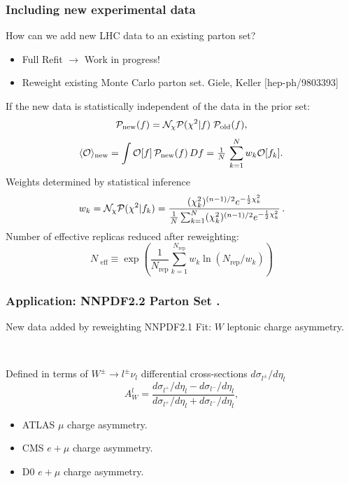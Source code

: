 \documentclass[10pt]{beamer}
\newcommand{\be}{\begin{equation*}}
\newcommand{\ee}{\end{equation*}}
\def\smallfrac#1#2{\hbox{${{#1}\over {#2}}$}}
\begin{document}
\begin{frame}
\frametitle{Including new experimental data}
How can we add new LHC data to an existing parton set?

\begin{itemize}
		\item<1-> Full Refit $\to$ Work in progress!
		\item<1-> Reweight existing Monte Carlo parton set. {\small \color{blue} Giele, Keller [hep-ph/9803393] }\\
\end{itemize}
If the new data is statistically independent of the data in the prior set:
\be
\mathcal{P}_{\rm new}(f)
= \mathcal{N}_{\chi}\mathcal{P}(\chi^2|f)\;\mathcal{P}_{\rm old}(f),
\ee
		\be \langle\mathcal{O}\rangle_{\mathrm {new}}=\int \mathcal{O}[f] \, \mathcal{P}_{ \mathrm {new}}(f)\,Df=\smallfrac{1}{N}\,\sum_{k=1}^{N}w_k\mathcal{O}[f_k].\,  \ee
Weights determined by statistical inference
\be w_k =\mathcal{N}_\chi\mathcal{P}(\chi^2|f_k) = 
\frac{(\chi^{2}_k)^{(n-1)/2} 
e^{-\frac{1}{2}\chi^{2}_k}}
{\smallfrac{1}{N}\sum_{k=1}^{N}(\chi^{2}_k)^{(n-1)/2}
e^{-\frac{1}{2}\chi^{2}_k}}\, .\ee
 Number of effective replicas reduced after reweighting: \be N_{\textrm{ eff}} \equiv \exp \left(\frac{1}{N_{\mathrm{rep}}}\sum_{k=1}^{N_{\mathrm{rep}}}w_k\ln(N_{\mathrm{rep}}/w_k)\right)\ee
{}


\end{frame}

\begin{frame}
\frametitle{Application: NNPDF2.2 Parton Set .}
New data added by reweighting NNPDF2.1 Fit: $W$ leptonic charge asymmetry.
\begin{centering}
\\
\end{centering}\vskip5pt
Defined in terms of $W^{\pm}\to l^\pm\nu_l $ differential cross-sections $d\sigma_{l^\pm}/d\eta_l$
\be 
  A^l_W=\frac{d\sigma_{l^{+}}/d\eta_{l}-d\sigma_{l^{-}}/d\eta_{l}}
  {d\sigma_{l^{+}}/d\eta_{l}+d\sigma_{l^{-}}/d\eta_{l}}, 
\ee

\begin{itemize}
		\item<1-> ATLAS $\mu$ charge asymmetry. \hspace*{\fill {  \color{blue} [arXiv:1103.2929]}}
		\item<1-> CMS $e+\mu$ charge asymmetry. \hspace*{\fill { \color{blue}  [arXiv:1103.3470] }}
		\item<1-> D0 $e+\mu$ charge asymmetry. \hspace*{\fill { \color{blue} [arXiv:0709.4254]}}
\end{itemize}

\begin{figure}[h!]
  \centering
\end{figure}

\end{frame}
\end{document}
